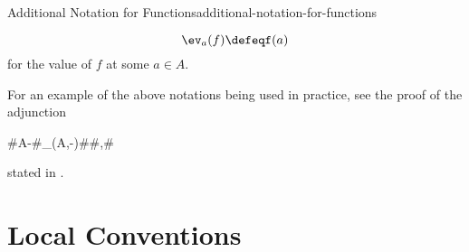\begin{notation}{Additional Notation for Functions}{additional-notation-for-functions}
\begin{enumerate}
            \[
                \ev_{a}(f)%
                \defeq%
                f(a)%
            \]%
            for the value of $f$ at some $a\in A$.
    \end{enumerate}
    For an example of the above notations being used in practice, see the proof of the adjunction
    \begin{webcompile}
        \AdjunctionShort#A\times -#{\Hom_{\Sets}(A,-)}#\Sets#\Sets,#
    \end{webcompile}
    stated in .
\end{notation}
\section{Local Conventions}\label{section-local-conventions}
\begin{appendices}

\end{appendices}

